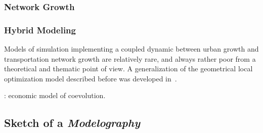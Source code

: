 \subsubsection{Network Growth}



\subsubsection{Hybrid Modeling}

Models of simulation implementing a coupled dynamic between urban growth and transportation network growth are relatively rare, and always rather poor from a theoretical and thematic point of view. A generalization of the geometrical local optimization model described before was developed in~\cite{barthelemy2009co}. %



\cite{levinson2007co} : economic model of coevolution. %



\subsection{Sketch of a \emph{Modelography}}










